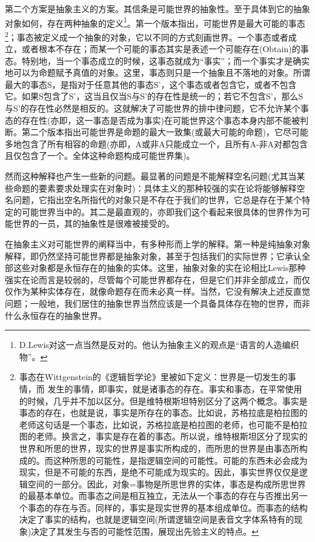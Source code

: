 \documentclass{article}
\begin{document}
第二个方案是抽象主义的方案。其信条是可能世界的抽象性。至于具体到它的抽象对象如何，存在两种抽象的定义\footnote{D.Lewis对这一点当然是反对的。他认为抽象主义的观点是“语言的人造编织物”。}。第一个版本指出，可能世界是最大可能的事态\footnote{事态在Wittgenstein的《逻辑哲学论》里被如下定义：世界是一切发生的事情，而
发生的事情，即事实，就是诸事态的存在。事实和事态，在平常使用的时候，几乎并不加以区分。但是维特根斯坦特别区分了这两个概念。事实是事态的存在，也就是说，事实是所存在的事态。比如说，苏格拉底是柏拉图的老师这句话是一个事态，比如说，苏格拉底是柏拉图的老师，也可能不是柏拉图的老师。换言之，事实是存在着的事态。所以说，维特根斯坦区分了现实的世界和所思的世界，现实的世界是事实所构成的，而所思的世界是由事态所构成的。而这种所思的可能性，是指逻辑空间的可能性。可能的东西未必会成为现实，但是不可能的东西，是绝不可能成为现实的。因此，事实世界仅仅是逻辑空间的一部分。因此，对象=事物是所思世界的实体，事态是构成所思世界的最基本单位。而事态之间是相互独立，无法从一个事态的存在与否推出另一个事态的存在与否。同样的，事实是现实世界的基本组成单位。而事态的结构决定了事实的结构，也就是逻辑空间(所谓逻辑空间是表音文字体系特有的现象)决定了其发生与否的可能性范围，展现出先验主义的特点。}；事态被定义成一个抽象的对象，它以不同的方式刻画世界。一个事态或者成立，或者根本不存在；而某一个可能的事态其实是表述一个可能存在(Obtain)的事态。特别地，当一个事态成立的时候，这事态就成为“事实”；而一个事实才是确实地可以为命题赋予真值的对象。这里，事态则只是一个抽象且不落地的对象。所谓最大的事态S，是指对于任意其他的事态S'，这个事态或者包含它，或者不包含它。如果S包含了S'，这当且仅当S与S'的存在性是统一的；若它不包含S'，那么S与S'的存在性必然是相反的。这就解决了可能世界的排中律问题，它不允许某个事态的存在性(亦即，这一事态是否成为事实)在可能世界这个事态本身内部不能被判断。第二个版本指出可能世界是命题的最大一致集(或最大可能的命题)，它尽可能多地包含了所有相容的命题(亦即，A或非A只能成立一个，且所有A-非A对都包含且仅包含了一个。全体这种命题构成可能世界集)。

然而这种解释也产生一些新的问题。最显著的问题是不能解释空名问题(尤其当某些命题的要素要求处理实在对象时)：具体主义的那种较强的实在论将能够解释空名问题，它指出空名所指代的对象只是不存在于我们的世界，它总是存在于某个特定的可能世界当中的。其二是最直观的，亦即我们这个看起来很具体的世界作为可能世界的一员，其的抽象性是很难被接受的。

在抽象主义对可能世界的阐释当中，有多种形而上学的解释。第一种是纯抽象对象解释，即仍然坚持可能世界都是抽象对象，甚至于包括我们的实际世界；它承认全部这些对象都是永恒存在的抽象的实体。这里，抽象对象的实在论相比Lewis那种强实在论而言是较弱的，尽管每个可能世界都存在，但是它们并非全部成立，而仅仅作为某种实体存在，就像命题存在而未必真一样。当然，它没有解决上述反直觉问题；一般地，我们居住的抽象世界当然应该是一个具备具体存在物的世界，而非什么永恒存在的抽象世界。
\end{document}
